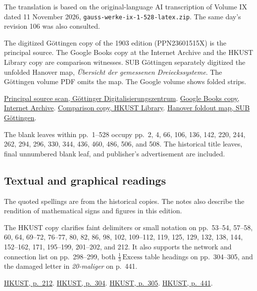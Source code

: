 The translation is based on the original-language AI transcription of Volume IX dated 11 November 2026, \texttt{gauss-werke-ix-1-528-latex.zip}. The same day's revision 106 was also consulted.

The digitized Göttingen copy of the 1903 edition (PPN23601515X) is the principal source. The Google Books copy at the Internet Archive and the HKUST Library copy are comparison witnesses. SUB Göttingen separately digitized the unfolded Hanover map, \textit{Übersicht der gemessenen Dreieckssysteme}. The Göttingen volume PDF omits the map. The Google volume shows folded strips.

\noindent\href{https://gdz.sub.uni-goettingen.de/download/pdf/PPN23601515X/PPN23601515X.pdf}{Principal source scan, Göttinger Digitalisierungszentrum}. \href{https://archive.org/details/carlfriedrichga01gausgoog9}{Google Books copy, Internet Archive}. \href{https://lbezone.hkust.edu.hk/rse/?p=13258}{Comparison copy, HKUST Library}. \href{https://webdoc.sub.gwdg.de/ebook/e/2005/gausscd/html/kapitel_landv_karte.htm}{Hanover foldout map, SUB Göttingen}.

The blank leaves within pp.~1--528 occupy pp.~2, 4, 66, 106, 136, 142, 220, 244, 262, 294, 296, 330, 344, 436, 460, 486, 506, and 508. The historical title leaves, final unnumbered blank leaf, and publisher's advertisement are included.

\subsection*{Textual and graphical readings}

The quoted spellings are from the historical copies. The notes also describe the rendition of mathematical signs and figures in this edition.

The HKUST copy clarifies faint delimiters or small notation on pp.~53--54, 57--58, 60, 64, 69--72, 76--77, 80, 82, 86, 98, 102, 109--112, 119, 125, 129, 132, 138, 144, 152--162, 171, 195--199, 201--202, and 212. It also supports the network and connection list on pp.~298--299, both \(\tfrac13\,\text{Excess}\) table headings on pp.~304--305, and the damaged letter in \textit{20-maliger} on p.~441.

\noindent\href{https://lbezone.hkust.edu.hk/obj/4/o/b761099/v9/pg00220.jpg}{HKUST, p.~212}. \href{https://lbezone.hkust.edu.hk/obj/4/o/b761099/v9/pg00312.jpg}{HKUST, p.~304}. \href{https://lbezone.hkust.edu.hk/obj/4/o/b761099/v9/pg00313.jpg}{HKUST, p.~305}. \href{https://lbezone.hkust.edu.hk/obj/4/o/b761099/v9/pg00451.jpg}{HKUST, p.~441}.

